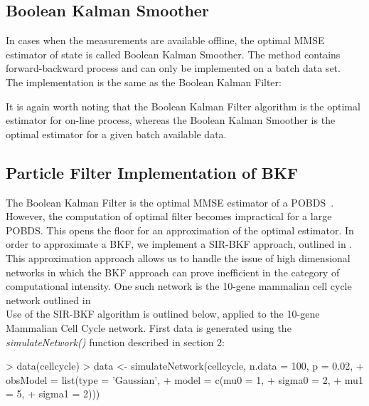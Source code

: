 \documentclass[a4paper]{article}
\theoremstyle{plain}
\theoremstyle{definition}
\theoremstyle{remark}
\begin{document}
\subsection{Boolean Kalman Smoother}
In cases when the measurements are available offline, the optimal MMSE estimator of state is called Boolean Kalman Smoother\cite{ImanBrag:15b}. The method contains forward-backward process and can only be implemented on a batch data set. 
\\[1em]
The implementation is the same as the Boolean Kalman Filter:

\begin{Schunk}
\end{Schunk}

It is again worth noting that the Boolean Kalman Filter algorithm is the optimal estimator for on-line process, whereas the Boolean Kalman Smoother is the optimal estimator for a given batch available data. 

\subsection{Particle Filter Implementation of BKF}
The Boolean Kalman Filter is the optimal MMSE estimator of a POBDS~\cite{Brag:11}. However, the computation of optimal filter becomes impractical for a large POBDS. This opens the floor for an approximation of the optimal estimator. In order to approximate a BKF, we implement a SIR-BKF  approach, outlined in \cite{braga2013particle}. 
\\[1em]
This approximation approach allows us to handle the issue of high dimensional networks in which the BKF approach can prove inefficient in the category of computational intensity. One such network is the 10-gene mammalian cell cycle network outlined in \cite{faure2006dynamical}
\\[1em]
Use of the SIR-BKF algorithm is outlined below, applied to the 10-gene Mammalian Cell Cycle network. First data is generated using the \textit{simulateNetwork()} function described in section 2:

\begin{Schunk}
\begin{Sinput}
> data(cellcycle)
> data <- simulateNetwork(cellcycle, n.data = 100, p = 0.02,
+                       obsModel = list(type = 'Gaussian',
+                                       model = c(mu0 = 1, 
+                                              sigma0 = 2, 
+                                                 mu1 = 5, 
+                                              sigma1 = 2)))
\end{Sinput}
\end{Schunk}
\end{document}
